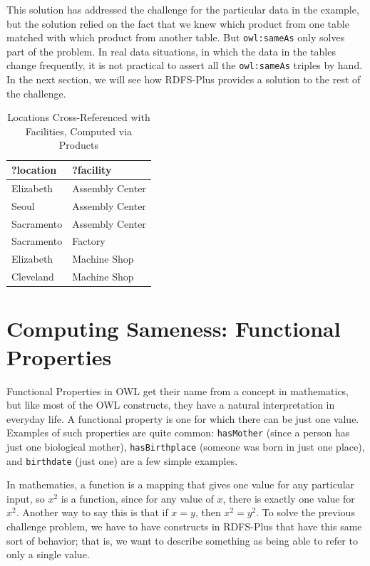 This solution has addressed the challenge for the particular data in the
example, but the solution relied on the fact that we knew which product
from one table matched with which product from another table. But
\texttt{owl:sameAs} only solves part of the problem. In real data situations, in
which the data in the tables change  frequently, it is not practical to assert all the \texttt{owl:sameAs} triples by
hand. In the next section, we will see how
RDFS-Plus provides a solution to the rest of the challenge.

\begin{table}
\caption{Locations Cross-Referenced with Facilities, Computed via
Products\label{tab:ch9.3}}
\begin{tabular}{|ll|}
\hline
?location&?facility\\
\hline
Elizabeth&Assembly Center\\
Seoul&Assembly Center\\
Sacramento&Assembly Center\\
Sacramento&Factory\\
Elizabeth&Machine Shop\\
Cleveland&Machine Shop \\
\hline
\end{tabular}
\end{table}



\section{Computing Sameness: Functional Properties}

Functional Properties in OWL get their name from a concept in
mathematics, but like most of the OWL constructs, they have a natural
interpretation in everyday life. A functional property is one for which
there can be just one value. Examples of such properties are quite
common: \texttt{hasMother} (since a person has just one biological mother),
\texttt{hasBirthplace} (someone was born in just one place), and \texttt{birthdate} (just
one) are a few simple examples.

In mathematics, a function is a mapping that gives one value for any
particular input, so $x^2$ is
a function, since for any value of $x$, there is exactly one value for $x^2$.
Another way to say this is that if
$x = y$, then $x^2 = y^2$. To solve the previous challenge problem, we have to
have constructs in RDFS-Plus that have this same sort of behavior; that
is, we want to describe something as being able to refer to only a
single value.

